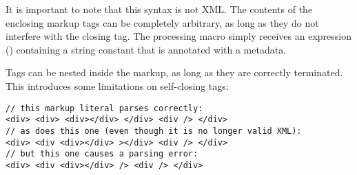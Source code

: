 
It is important to note that this syntax is not XML. The contents of the enclosing markup tags can be completely arbitrary, as long as they do not interfere with the closing tag. The processing macro simply receives an expression () containing a string constant that is annotated with a  metadata.

Tags can be nested inside the markup, as long as they are correctly terminated. This introduces some limitations on self-closing tags:

\begin{lstlisting}
// this markup literal parses correctly:
<div> <div> <div></div> </div> <div /> </div>
// as does this one (even though it is no longer valid XML):
<div> <div <div></div> ></div> <div /> </div>
// but this one causes a parsing error:
<div> <div <div></div> /> <div /> </div>
\end{lstlisting}

